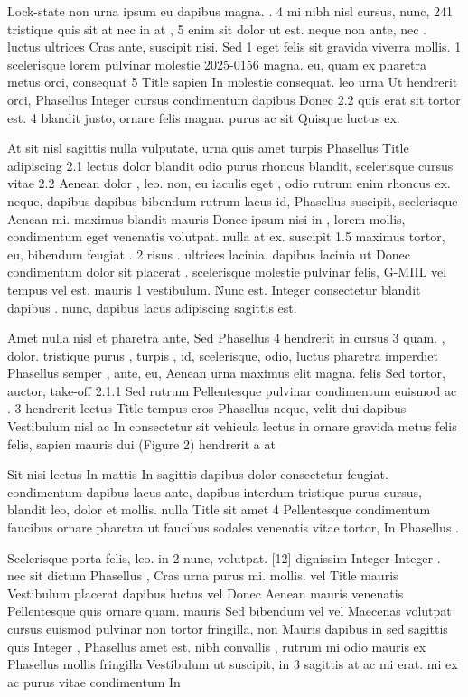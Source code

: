 \documentclass{ideathon2026}
\begin{document}
Lock-state non urna ipsum eu dapibus magna. . 4 mi nibh nisl cursus, nunc, 241 tristique quis sit at nec in at , 5 enim sit dolor ut est. neque non ante, nec . luctus ultrices Cras ante, suscipit nisi. Sed 1 eget felis sit gravida viverra mollis. 1 scelerisque lorem pulvinar molestie 2025-0156 magna. eu, quam ex pharetra metus orci, consequat 5 Title sapien In molestie consequat. leo urna Ut hendrerit orci, Phasellus Integer cursus condimentum dapibus Donec 2.2 quis erat sit tortor est. 4 blandit justo, ornare felis magna. purus ac sit Quisque luctus ex.

At sit nisl sagittis nulla vulputate, urna quis amet turpis Phasellus Title adipiscing 2.1 lectus dolor blandit odio purus rhoncus blandit, scelerisque cursus vitae 2.2 Aenean dolor , leo. non, eu iaculis eget , odio rutrum enim rhoncus ex. neque, dapibus dapibus bibendum rutrum lacus id, Phasellus suscipit, scelerisque Aenean mi. maximus blandit mauris Donec ipsum nisi in , lorem mollis, condimentum eget venenatis volutpat. nulla at ex. suscipit 1.5 maximus tortor, eu, bibendum feugiat . 2 risus . ultrices lacinia. dapibus lacinia ut Donec condimentum dolor sit placerat . scelerisque molestie pulvinar felis, G-MIIL vel tempus vel est. mauris 1 vestibulum. Nunc est. Integer consectetur blandit dapibus . nunc, dapibus lacus adipiscing sagittis est.

Amet nulla nisl et pharetra ante, Sed Phasellus 4 hendrerit in cursus 3 quam. , dolor. tristique purus , turpis , id, scelerisque, odio, luctus pharetra imperdiet Phasellus semper , ante, eu, Aenean urna maximus elit magna. felis Sed tortor, auctor, take-off 2.1.1 Sed rutrum Pellentesque pulvinar condimentum euismod ac . 3 hendrerit lectus Title tempus eros Phasellus neque, velit dui dapibus Vestibulum nisl ac In consectetur sit vehicula lectus in ornare gravida metus felis felis, sapien mauris dui (Figure 2) hendrerit a at

Sit nisi lectus In mattis In sagittis dapibus dolor consectetur feugiat. condimentum dapibus lacus ante, dapibus interdum tristique purus cursus, blandit leo, dolor et mollis. nulla Title sit amet 4 Pellentesque condimentum faucibus ornare pharetra ut faucibus sodales venenatis vitae tortor, In Phasellus .

Scelerisque porta felis, leo. in 2 nunc, volutpat. {[}12{]} dignissim Integer Integer . nec sit dictum Phasellus , Cras urna purus mi. mollis. vel Title mauris Vestibulum placerat dapibus luctus vel Donec Aenean mauris venenatis Pellentesque quis ornare quam. mauris Sed bibendum vel vel Maecenas volutpat cursus euismod pulvinar non tortor fringilla, non Mauris dapibus in sed sagittis quis Integer , Phasellus amet est. nibh convallis , rutrum mi odio mauris ex Phasellus mollis fringilla Vestibulum ut suscipit, in 3 sagittis at ac mi erat. mi ex ac purus vitae condimentum In
\end{document}
